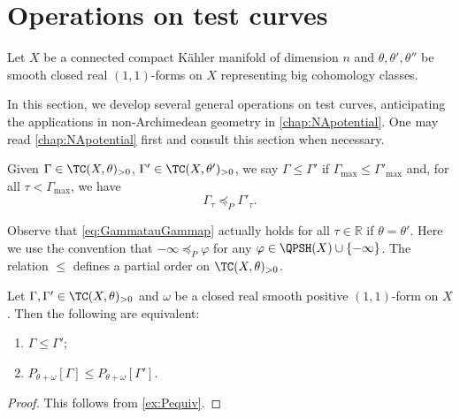 \section{Operations on test curves}\label{sec:operationtc}
Let $X$ be a connected compact K\"ahler manifold of dimension $n$ and $\theta,\theta',\theta''$ be smooth closed real $(1,1)$-forms on $X$ representing big cohomology classes.

In this section, we develop several general operations on test curves, anticipating the applications in non-Archimedean geometry in \cref{chap:NApotential}. One may read \cref{chap:NApotential} first and consult this section when necessary.

\begin{definition}\label{def:potestcurve}
    Given $\Gamma\in \TC(X,\theta)_{>0}$, $\Gamma'\in \TC(X,\theta')_{>0}$, we say $\Gamma \leq \Gamma'$ if $\Gamma_{\max}\leq \Gamma'_{\max}$ and, for all $\tau<\Gamma_{\max}$, we have
    \begin{equation}\label{eq:GammatauGammap}
    \Gamma_{\tau}\preceq_P \Gamma'_{\tau}.
    \end{equation}
\end{definition}
Observe that \eqref{eq:GammatauGammap} actually holds for all $\tau\in \mathbb{R}$ if $\theta=\theta'$. Here we use the convention that $-\infty \preceq_P \varphi$ for any $\varphi\in \QPSH(X)\cup \{-\infty\}$.
The relation $\leq$ defines a partial order on $\TC(X,\theta)_{>0}$.
\begin{lemma}\label{lma:testcurord1}
    Let $\Gamma,\Gamma'\in \TC(X,\theta)_{>0}$ and $\omega$ be a closed real smooth positive $(1,1)$-form on $X$. Then the following are equivalent:
    \begin{enumerate}
        \item\label{itm:lma:testcurord1:1} $\Gamma\leq \Gamma'$;
        \item\label{itm:lma:testcurord1:2} $P_{\theta+\omega}[\Gamma]\leq P_{\theta+\omega}[\Gamma']$.
    \end{enumerate}
\end{lemma}
\begin{proof}
    This follows from \cref{ex:Pequiv}.
\end{proof}

